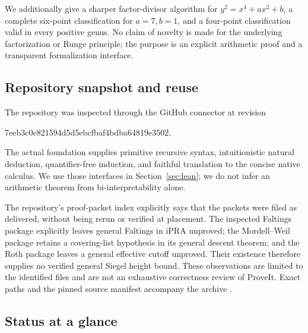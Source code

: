We additionally give a sharper factor-divisor algorithm for
$y^2=x^4+ax^2+b$, a complete six-point classification for $a=7,b=1$,
and a four-point classification valid in every positive genus. No
claim of novelty is made for the underlying factorization or Runge
principle; the purpose is an explicit arithmetic proof and a transparent
formalization interface.

\subsection{Repository snapshot and reuse}

The repository was inspected through the GitHub connector at revision
\begin{center}\small\ttfamily
7eeb3c0e821594d5d5ebcfbaf4bdba64819e3502.
\end{center}
The actual foundation supplies primitive recursive syntax, intuitionistic
natural deduction, quantifier-free induction, and faithful translation
to the concise native calculus. We use those interfaces in
Section~\ref{sec:lean}; we do not infer an arithmetic theorem from
bi-interpretability alone.

The repository's proof-packet index explicitly says that the packets were
filed as delivered, without being rerun or verified at placement.
The inspected Faltings package explicitly leaves general Faltings in iPRA
unproved; the Mordell--Weil package retains a covering-list hypothesis in
its general descent theorem; and the Roth package leaves a general
effective cutoff unproved. Their existence therefore supplies no verified
general Siegel height bound. These observations are limited to the
identified files and are not an exhaustive correctness review of ProveIt.
Exact paths and the pinned source manifest accompany the archive
\cite{ProveIt2026}.

\subsection{Status at a glance}

